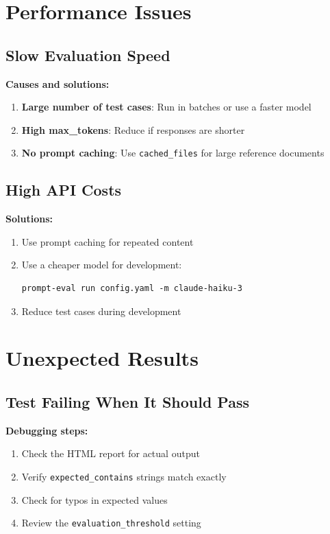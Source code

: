 \documentclass[11pt,a4paper]{report}
\begin{document}
\section{Performance Issues}

\subsection{Slow Evaluation Speed}

\textbf{Causes and solutions:}
\begin{enumerate}
    \item \textbf{Large number of test cases}: Run in batches or use a faster model
    \item \textbf{High max\_tokens}: Reduce if responses are shorter
    \item \textbf{No prompt caching}: Use \texttt{cached\_files} for large reference documents
\end{enumerate}

\subsection{High API Costs}

\textbf{Solutions:}
\begin{enumerate}
    \item Use prompt caching for repeated content
    \item Use a cheaper model for development:
    \begin{lstlisting}[style=bash]
prompt-eval run config.yaml -m claude-haiku-3
    \end{lstlisting}
    \item Reduce test cases during development
\end{enumerate}

\section{Unexpected Results}

\subsection{Test Failing When It Should Pass}

\textbf{Debugging steps:}
\begin{enumerate}
    \item Check the HTML report for actual output
    \item Verify \texttt{expected\_contains} strings match exactly
    \item Check for typos in expected values
    \item Review the \texttt{evaluation\_threshold} setting
\end{enumerate}
\end{document}
